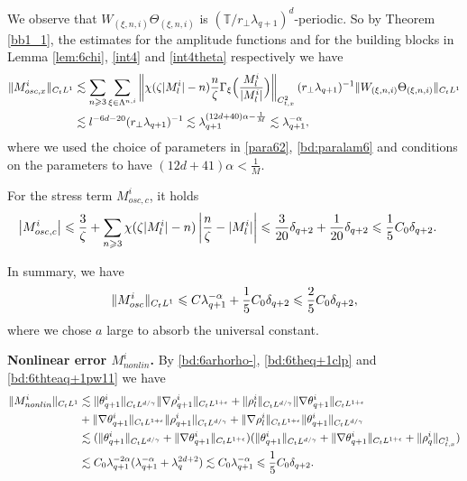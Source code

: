 \documentclass[10pt,a4paper]{amsart}
\numberwithin{equation}{section}
\def\({{\Big(}}
\def\){{\Big)}}
\newcommand{\norm}[1]{\left\|#1\right\|}
\def\geq{\geqslant}
\def\leq{\leqslant}
\def\({{\Big(}}
\def\){{\Big)}}
\def\geq{\geqslant}
\def\leq{\leqslant}
\begin{document}
We observe that $W_{(\xi,n,i)}\Theta_{(\xi,n,i)}$ is $(\mathbb{T}/r_\perp\lambda_{q+1})^d$-periodic. So by  Theorem \ref{bb1_1},  the estimates for the amplitude functions and for the building blocks  in Lemma \ref{lem:6chi}, \eqref{int4} and \eqref{int4theta} respectively    we have
\begin{align}
\|M^{i}_{osc,x} \|_{C_tL^1}
&\lesssim\sum_{n\geq3}\sum_{\xi\in\Lambda^{n,i}}\norm{\chi(\zeta|M^{i}_l|-n)\frac{n}{\zeta}\Gamma_{\xi}\(\frac{M^{i}_l}{|M^{i}_l|}\)}_{C_{t,x}^2} (r_\perp\lambda_{q+1})^{-1}\|W_{(\xi,n,i)}\Theta_{(\xi,n,i)}\|_{C_tL^{1}} \notag\\
&\lesssim l^{-6d-20}(r_\perp\lambda_{q+1})^{-1}\lesssim \lambda_{q+1}^{(12d+40)\alpha-\frac{1}{M}}
\lesssim  \lambda_{q+1}^{-\alpha}, \notag
\end{align}
where we used the choice of parameters in \eqref{para62}, \eqref{bd:paralam6} and  conditions on the parameters to have $(12d+41)\alpha<\frac{1}{M} $.

For the stress term $M^{i}_{osc,c}$, it holds
\begin{align}
     \left| M_{osc,c}^i\right|%
     &\leq \frac{3}{\zeta}+\sum_{n\geq3}\chi(\zeta|M_l^i|-n)\left|\frac{n}{\zeta}- |M_l^i|\right|\leq \frac{3}{20}\delta_{q+2}+\frac{1}{20}\delta_{q+2}
     \leq \frac15C_0 \delta_{q+2}.\notag
\end{align}
 

In summary, we have
\begin{align}
    \|M^{i}_{osc}\|_{C_tL^1} \leq C \lambda_{q+1}^{-\alpha}+ \frac15C_0 \delta_{q+2}\leq \frac{2}{5}C_0 \delta_{q+2},\notag
\end{align}
where we chose $a$ large to absorb the universal constant.

\textbf{Nonlinear error $M_{nonlin}^i$.} 
 By \eqref{bd:6arhorho-},  
  \eqref{bd:6theq+1clp} and \eqref{bd:6thteaq+1pw11} we have 
\begin{align*}
    \|M^i_{nonlin}\|_{C_tL^1} 
     &\lesssim \| \theta_{q+1}^i \|_{C_tL^{d/\gamma}}\|\nabla\rho_{q+1}^i\|_{C_tL^{1+\epsilon}}+\| \rho_l^i\|_{C_tL^{d/\gamma}}\|\nabla \theta_{q+1}^i\|_{C_tL^{1+\epsilon}}\\
     &+\|  \nabla \theta_{q+1}^i\|_{C_tL^{1+\epsilon}}\|\rho_{q+1}^i\|_{C_tL^{d/\gamma}}+\|  \nabla\rho_l^i\|_{C_tL^{1+\epsilon}}\|\theta_{q+1}^i\|_{C_tL^{d/\gamma}}\\
     &\lesssim (\| \theta_{q+1}^i \|_{C_tL^{d/\gamma}}+\|  \nabla \theta_{q+1}^i\|_{C_tL^{1+\epsilon}})(\| \theta_{q+1}^i \|_{C_tL^{d/\gamma}}+\|  \nabla \theta_{q+1}^i\|_{C_tL^{1+\epsilon}}+\| \rho_q^i\|_{C_{t,x}^1}) \\
     &\lesssim C_0\lambda_{q+1}^{-2\alpha}(\lambda_{q+1}^{-\alpha}+\lambda_q^{2d+2})\lesssim    C_0 \lambda_{q+1}^{-\alpha}\leq \frac{1}{5}C_0 \delta_{q+2}.\notag
\end{align*}
\end{document}
